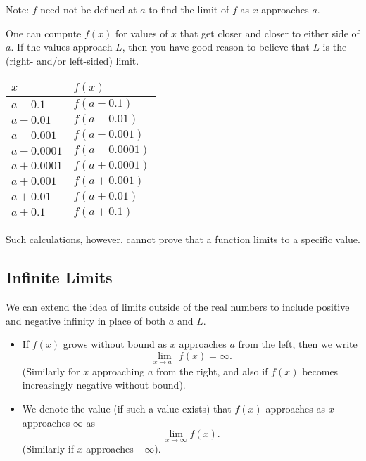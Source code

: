 \noindent Note: $f$ need not be defined at $a$ to find the limit of $f$ as $x$ approaches $a$.

\vspace{1em}

One can compute $f(x)$ for values of $x$ that get closer and closer to either side of $a$. If the values approach $L$, then you have good reason to believe that $L$ is the (right- and/or left-sided) limit.

\begin{center}
\begin{tabular}{@{}ll@{}}
\toprule[0.4mm]
   $x$        & $f(x)$        \\
\midrule
   $a-0.1$    & $f(a-0.1)$    \\
   $a-0.01$   & $f(a-0.01)$   \\
   $a-0.001$  & $f(a-0.001)$  \\
   $a-0.0001$ & $f(a-0.0001)$ \\
\midrule
   $a+0.0001$ & $f(a+0.0001)$ \\
   $a+0.001$  & $f(a+0.001)$  \\
   $a+0.01$   & $f(a+0.01)$   \\
   $a+0.1$    & $f(a+0.1)$    \\
\bottomrule[0.4mm]
\end{tabular}
\end{center}

Such calculations, however, cannot prove that a function limits to a specific value.

\subsection{Infinite Limits}

We can extend the idea of limits outside of the real numbers to include positive and negative infinity in place of both $a$ and $L$.
\begin{itemize}
\item If $f(x)$ grows without bound as $x$ approaches $a$ from the left, then we write $$\lim_{x\to a^-}f(x)=\infty.$$
(Similarly for $x$ approaching $a$ from the right, and also if $f(x)$ becomes increasingly negative without bound).
\item We denote the value (if such a value exists) that $f(x)$ approaches as $x$ approaches $\infty$ as $$\lim_{x\to\infty} f(x).$$
(Similarly if $x$ approaches $-\infty$).
\end{itemize}



